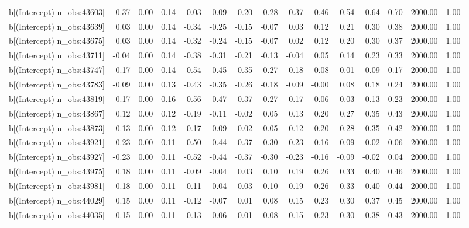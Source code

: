 \begin{table}[ht]
\begin{tabular}{rrrrrrrrrrrrrrr}
  b[(Intercept) n\_obs:43603] & 0.37 & 0.00 & 0.14 & 0.03 & 0.09 & 0.20 & 0.28 & 0.37 & 0.46 & 0.54 & 0.64 & 0.70 & 2000.00 & 1.00 \\ 
  b[(Intercept) n\_obs:43639] & 0.03 & 0.00 & 0.14 & -0.34 & -0.25 & -0.15 & -0.07 & 0.03 & 0.12 & 0.21 & 0.30 & 0.38 & 2000.00 & 1.00 \\ 
  b[(Intercept) n\_obs:43675] & 0.03 & 0.00 & 0.14 & -0.32 & -0.24 & -0.15 & -0.07 & 0.02 & 0.12 & 0.20 & 0.30 & 0.37 & 2000.00 & 1.00 \\ 
  b[(Intercept) n\_obs:43711] & -0.04 & 0.00 & 0.14 & -0.38 & -0.31 & -0.21 & -0.13 & -0.04 & 0.05 & 0.14 & 0.23 & 0.33 & 2000.00 & 1.00 \\ 
  b[(Intercept) n\_obs:43747] & -0.17 & 0.00 & 0.14 & -0.54 & -0.45 & -0.35 & -0.27 & -0.18 & -0.08 & 0.01 & 0.09 & 0.17 & 2000.00 & 1.00 \\ 
  b[(Intercept) n\_obs:43783] & -0.09 & 0.00 & 0.13 & -0.43 & -0.35 & -0.26 & -0.18 & -0.09 & -0.00 & 0.08 & 0.18 & 0.24 & 2000.00 & 1.00 \\ 
  b[(Intercept) n\_obs:43819] & -0.17 & 0.00 & 0.16 & -0.56 & -0.47 & -0.37 & -0.27 & -0.17 & -0.06 & 0.03 & 0.13 & 0.23 & 2000.00 & 1.00 \\ 
  b[(Intercept) n\_obs:43867] & 0.12 & 0.00 & 0.12 & -0.19 & -0.11 & -0.02 & 0.05 & 0.13 & 0.20 & 0.27 & 0.35 & 0.43 & 2000.00 & 1.00 \\ 
  b[(Intercept) n\_obs:43873] & 0.13 & 0.00 & 0.12 & -0.17 & -0.09 & -0.02 & 0.05 & 0.12 & 0.20 & 0.28 & 0.35 & 0.42 & 2000.00 & 1.00 \\ 
  b[(Intercept) n\_obs:43921] & -0.23 & 0.00 & 0.11 & -0.50 & -0.44 & -0.37 & -0.30 & -0.23 & -0.16 & -0.09 & -0.02 & 0.06 & 2000.00 & 1.00 \\ 
  b[(Intercept) n\_obs:43927] & -0.23 & 0.00 & 0.11 & -0.52 & -0.44 & -0.37 & -0.30 & -0.23 & -0.16 & -0.09 & -0.02 & 0.04 & 2000.00 & 1.00 \\ 
  b[(Intercept) n\_obs:43975] & 0.18 & 0.00 & 0.11 & -0.09 & -0.04 & 0.03 & 0.10 & 0.19 & 0.26 & 0.33 & 0.40 & 0.46 & 2000.00 & 1.00 \\ 
  b[(Intercept) n\_obs:43981] & 0.18 & 0.00 & 0.11 & -0.11 & -0.04 & 0.03 & 0.10 & 0.19 & 0.26 & 0.33 & 0.40 & 0.44 & 2000.00 & 1.00 \\ 
  b[(Intercept) n\_obs:44029] & 0.15 & 0.00 & 0.11 & -0.12 & -0.07 & 0.01 & 0.08 & 0.15 & 0.23 & 0.30 & 0.37 & 0.45 & 2000.00 & 1.00 \\ 
  b[(Intercept) n\_obs:44035] & 0.15 & 0.00 & 0.11 & -0.13 & -0.06 & 0.01 & 0.08 & 0.15 & 0.23 & 0.30 & 0.38 & 0.43 & 2000.00 & 1.00 \\ 

\end{tabular}
\end{table}
